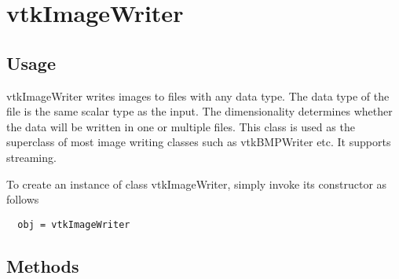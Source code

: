 \section{vtkImageWriter}

\subsection{Usage}

 vtkImageWriter writes images to files with any data type. The data type of
 the file is the same scalar type as the input.  The dimensionality
 determines whether the data will be written in one or multiple files.
 This class is used as the superclass of most image writing classes 
 such as vtkBMPWriter etc. It supports streaming.

To create an instance of class vtkImageWriter, simply
invoke its constructor as follows
\begin{verbatim}
  obj = vtkImageWriter
\end{verbatim}
\subsection{Methods}

